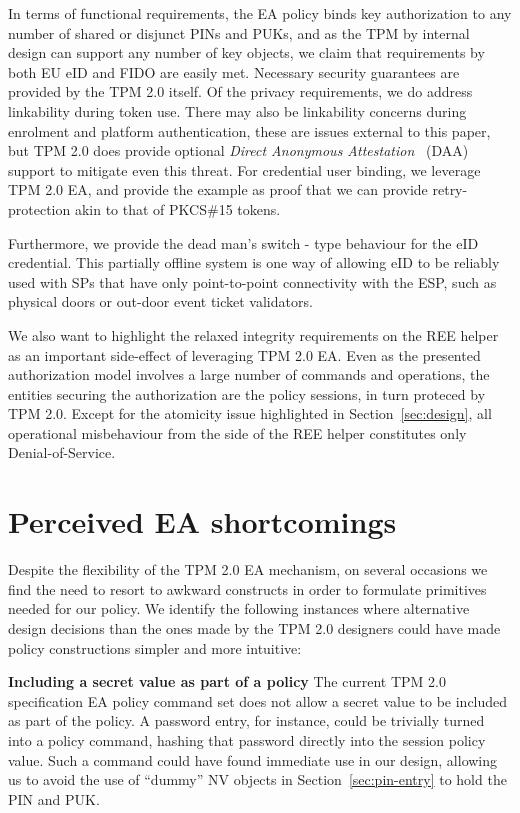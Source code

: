 \documentclass{sig-alternate-2013}
\begin{document}
In terms of functional requirements, the EA policy binds key authorization to
any number of shared or disjunct PINs and PUKs, and as the TPM by internal
design can support any number of key objects, we claim that requirements by both
EU eID and FIDO are easily met. Necessary security guarantees are provided by
the TPM 2.0 itself. Of the privacy requirements, we do address linkability during
token use. There may also be linkability concerns during enrolment and platform
authentication, these are issues external to this paper, but TPM 2.0 does provide
optional \emph{Direct Anonymous Attestation}~\cite{Chen13} (DAA) support to
mitigate even this threat. For credential user binding, we leverage TPM 2.0 EA,
and provide the example as proof that we can provide retry-protection akin to
that of PKCS\#15 tokens.

Furthermore, we provide the dead man's switch - type behaviour for the eID
credential. This partially offline system is one way of allowing eID to be
reliably used with SPs that have only point-to-point connectivity with the ESP,
such as physical doors or out-door event ticket validators.

We also want to highlight the relaxed integrity requirements on the REE helper
as an important side-effect of leveraging TPM 2.0 EA\@. Even as the presented
authorization model involves a large number of commands and operations, the
entities securing the authorization are the policy sessions, in turn proteced by
TPM 2.0. Except for the atomicity issue highlighted in Section~\ref{sec:design},
all operational misbehaviour from the side of the REE helper constitutes only
Denial-of-Service.

\section{Perceived EA shortcomings}
\label{sec:perceived-ea-shortcomings}

Despite the flexibility of the TPM 2.0 EA mechanism, on several occasions we
find the need to resort to awkward constructs in order to formulate primitives
needed for our policy. We identify the following instances where alternative
design decisions than the ones made by the TPM 2.0 designers could have made
policy constructions simpler and more intuitive:

\noindent\textbf{Including a secret value as part of a policy} The current TPM
2.0 specification EA policy command set does not allow a secret value to be
included as part of the policy. A password entry, for instance, could be
trivially turned into a policy command, hashing that password directly into the
session policy value. Such a command could have found immediate use in our
design, allowing us to avoid the use of ``dummy'' NV objects in
Section~\ref{sec:pin-entry} to hold the PIN and PUK.
\end{document}
